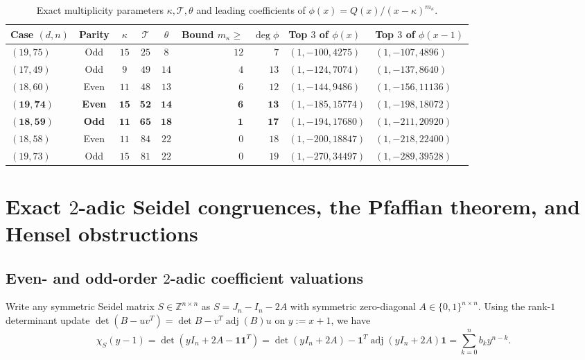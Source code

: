 \documentclass[11pt,reqno]{amsart}
\theoremstyle{definition}
\theoremstyle{remark}
\numberwithin{equation}{section}
\numberwithin{table}{section}
\DeclareMathOperator{\adj}{adj}
\begin{document}
\begin{table}[htbp]
\centering
\caption{Exact multiplicity parameters $\kappa, \mathcal{T}, \theta$ and leading coefficients of $\phi(x) = Q(x)/(x-\kappa)^{m_\kappa}$.}\label{tab:gsy_params}
\footnotesize
\setlength{\tabcolsep}{4.5pt}
\begin{tabular}{@{}lccccrrll@{}}
\toprule
Case $(d,n)$ & Parity & $\kappa$ & $\mathcal{T}$ & $\theta$ & Bound $m_\kappa \ge$ & $\deg\phi$ & Top $3$ of $\phi(x)$ & Top $3$ of $\phi(x-1)$ \\
\midrule
$(19, 75)$ & Odd & $15$ & $25$ & $8$ & $12$ & $7$ & $(1, -100, 4275)$ & $(1, -107, 4896)$ \\
$(17, 49)$ & Odd & $9$ & $49$ & $14$ & $4$ & $13$ & $(1, -124, 7074)$ & $(1, -137, 8640)$ \\
$(18, 60)$ & Even & $11$ & $48$ & $13$ & $6$ & $12$ & $(1, -144, 9486)$ & $(1, -156, 11136)$ \\
$\mathbf{(19, 74)}$ & \textbf{Even} & $\mathbf{15}$ & $\mathbf{52}$ & $\mathbf{14}$ & $\mathbf{6}$ & $\mathbf{13}$ & $(1, -185, 15774)$ & $(1, -198, 18072)$ \\
$\mathbf{(18, 59)}$ & \textbf{Odd} & $\mathbf{11}$ & $\mathbf{65}$ & $\mathbf{18}$ & $\mathbf{1}$ & $\mathbf{17}$ & $(1, -194, 17680)$ & $(1, -211, 20920)$ \\
$(18, 58)$ & Even & $11$ & $84$ & $22$ & $0$ & $18$ & $(1, -200, 18847)$ & $(1, -218, 22400)$ \\
$(19, 73)$ & Odd & $15$ & $81$ & $22$ & $0$ & $19$ & $(1, -270, 34497)$ & $(1, -289, 39528)$ \\
\bottomrule
\end{tabular}
\end{table}

\section{Exact \texorpdfstring{$2$}{2}-adic Seidel congruences, the Pfaffian theorem, and Hensel obstructions}\label{sec:twoadic}

\subsection{Even- and odd-order \texorpdfstring{$2$}{2}-adic coefficient valuations}
Write any symmetric Seidel matrix $S \in \mathbb{Z}^{n \times n}$ as $S = J_n - I_n - 2A$ with symmetric zero-diagonal $A \in \{0, 1\}^{n \times n}$. Using the rank-$1$ determinant update $\det(B - uv^T) = \det B - v^T \adj(B) u$ on $y := x + 1$, we have
\begin{equation}\label{eq:rank1_charpoly}
  \chi_S(y - 1) = \det(yI_n + 2A - \mathbf{1}\mathbf{1}^T) = \det(yI_n + 2A) - \mathbf{1}^T \adj(yI_n + 2A) \mathbf{1} = \sum_{k=0}^n b_k y^{n - k}.
\end{equation}
\end{document}
